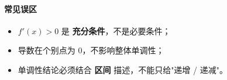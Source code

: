 \begin{trapbox}
\paragraph{常见误区}

\begin{itemize}
  \item $f'(x)>0$ 是 \textbf{充分条件}，不是必要条件；
  \item 导数在个别点为 0，不影响整体单调性；
  \item 单调性结论必须结合 \textbf{区间} 描述，不能只给"递增 / 递减"。
\end{itemize}
\end{trapbox}